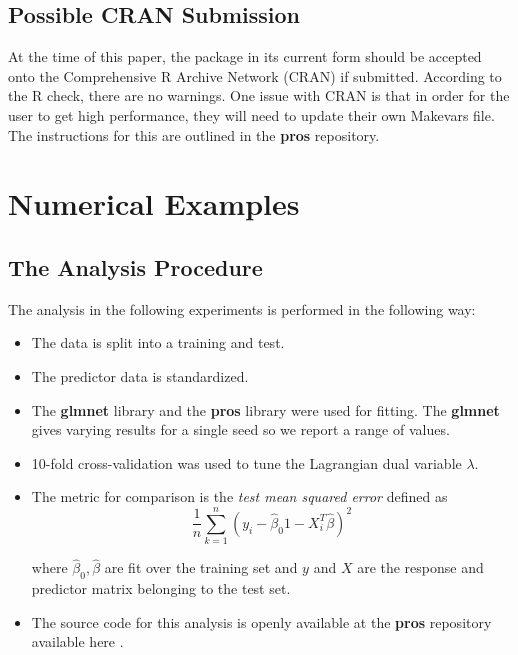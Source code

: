 \documentclass[article]{jss}
\numberwithin{equation}{section}
\begin{document}
\subsection{Possible CRAN Submission}

At the time of this paper, the package in its current form should be accepted onto the Comprehensive R Archive Network (CRAN) if submitted.
According to the R check, there are no warnings.
One issue with CRAN is that in order for the user to get high performance, they will need to update their own Makevars file. The instructions for this are outlined in the \textbf{pros} repository.

\section{Numerical Examples}

\subsection{The Analysis Procedure}

The analysis in the following experiments is performed in the following way:

\begin{itemize}

\item The data is split into a training and test.

\item The predictor data is standardized.

\item The \textbf{glmnet} library and the \textbf{pros} library were used for fitting. The \textbf{glmnet} gives varying results for a single seed so we report a range of values.

\item 10-fold cross-validation was used to tune the Lagrangian dual variable $\lambda$.

\item The metric for comparison is the \textit{test mean squared error} defined as
\[
\frac{1}{n}\sum_{k = 1}^n \left( y_i - \hat \beta_0 1 - X_i^T \hat \beta \right)^2
\]

where $\hat \beta_0, \hat \beta$ are fit over the training set and $y$ and $X$ are the response and predictor matrix belonging to the test set.

\item The source code for this analysis is openly available at the \textbf{pros} repository available here \cite{pros}.

\end{itemize}
\end{document}
